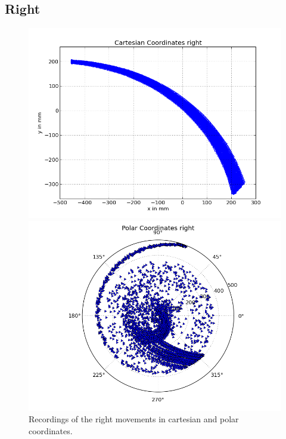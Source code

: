 \documentclass{scrartcl}
\begin{document}
\subsection{Right}
\begin{figure}[H]
\centering
\begin{minipage}{.5\textwidth}
  \centering
  \includegraphics[width=.8\linewidth]{img/right_c.png}
\end{minipage}%
\begin{minipage}{.5\textwidth}
  \centering
  \includegraphics[width=.8\linewidth]{img/right_pc_c.png}
\end{minipage}
\caption{Recordings of the right movements in cartesian and polar coordinates.}
\label{fig:right}
\end{figure}
\end{document}
